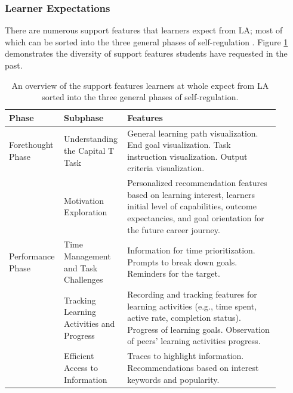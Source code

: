 \documentclass{l4proj}
\begin{document}
\subsubsection{Learner Expectations}
\hfill

There are numerous support features that learners expect from LA; most of which can be sorted into the three general phases of self-regulation \citep{Panadero_2017, Dwiarie2023PersonalizedAnalytics}. Figure \ref{fig:selfregulation} demonstrates the diversity of support features students have requested in the past. 


\begin{longtable}{p{0.15\linewidth} | p{0.2\linewidth} | p{0.55\linewidth}}
\caption{An overview of the support features learners at whole expect from LA sorted into the three general phases of self-regulation.} \label{fig:selfregulation} \\
\toprule
Phase &
  Subphase &
  Features \\ \midrule
Forethought Phase &
  Understanding the Capital T Task &
  General learning path visualization. \newline
  End goal visualization. \newline
  Task instruction visualization. \newline
  Output criteria visualization. \\
 &
  Motivation Exploration &
  Personalized recommendation features based on learning interest, learners initial level of capabilities, outcome expectancies, and goal orientation for the future career journey. \newline \\
Performance Phase &
  Time Management and Task Challenges &
  Information for time prioritization.\newline
  Prompts to break down goals.\newline
  Reminders for the target. \\
 &
  Tracking Learning Activities and Progress &
  Recording and tracking features for learning activities (e.g., time spent, active rate, completion status).\newline
  Progress of learning goals.\newline
  Observation of peers' learning activities progress. \\
 &
  Efficient Access to Information &
  Traces to highlight information.\newline
  Recommendations based on interest keywords and popularity. \\

\end{longtable}
\end{document}
